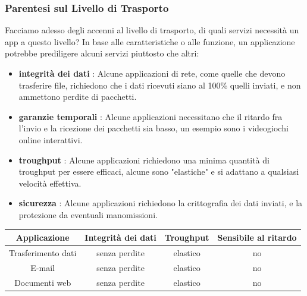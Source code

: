 \documentclass[12pt, letterpaper]{article}
\begin{document}
\subsubsection{Parentesi sul Livello di Trasporto}
Facciamo adesso degli accenni al livello di trasporto, di quali servizi necessità un app a questo livello? In
base alle caratteristiche o alle funzione, un applicazione potrebbe prediligere alcuni servizi piuttosto che altri:\begin{itemize}
    \item \textbf{integrità dei dati} : Alcune applicazioni di rete, come quelle che devono trasferire file,
          richiedono che i dati ricevuti siano al 100\% quelli inviati, e non ammettono perdite di pacchetti.
    \item \textbf{garanzie temporali} : Alcune applicazioni necessitano che il ritardo fra l'invio e la
          ricezione dei pacchetti sia basso, un esempio sono i videogiochi online interattivi.
    \item \textbf{troughput} : Alcune applicazioni richiedono una minima quantità di troughput per essere
          efficaci, alcune sono "elastiche" e si adattano a qualsiasi velocità effettiva.
    \item \textbf{sicurezza} : Alcune applicazioni richiedono la crittografia dei dati inviati, e la protezione
          da eventuali manomissioni.
\end{itemize}\begin{center}
    \begin{tabular}{|c|c|c|c|}
        \hline
        \rowcolor[HTML]{ECF4FF}
        \textbf{Applicazione}      & \textbf{Integrità dei dati} & \textbf{Troughput}                                                                 & \textbf{Sensibile al ritardo} \\ \hline
        Trasferimento dati         & senza perdite               & elastico                                                                           & no                            \\ \hline
        \rowcolor[HTML]{EFEFEF}
        E-mail                     & senza perdite               & elastico                                                                           & no                            \\ \hline
        Documenti web              & senza perdite               & elastico                                                                           & no                            \\ \hline

\end{tabular}
\end{center}
\end{document}
